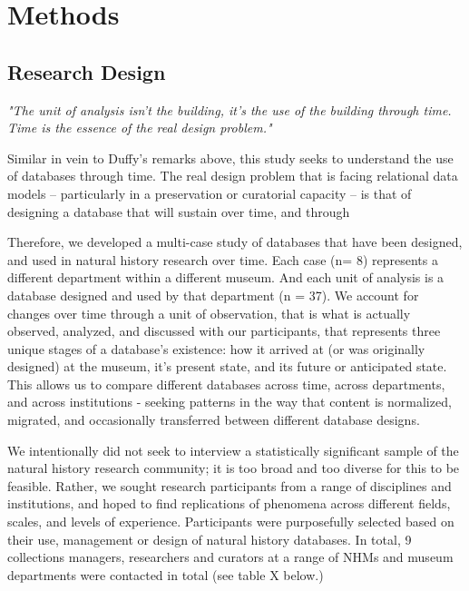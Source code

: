 \section{Methods}

\subsection{Research Design}
\textit{"The unit of analysis isn't the building, it's the use of the building through time. Time is the essence of the real design problem."}\cite{duffy1990measuring}

Similar in vein to Duffy's remarks above, this study seeks to understand the use of databases through time. The real design problem that is facing relational data models -- particularly in a preservation or curatorial capacity -- is that of designing a database that will sustain over time, and through  

Therefore, we developed a multi-case study of databases that have been designed, and used in natural history research over time. Each case (n= 8) represents a different department within a different museum. And each unit of analysis is a database designed and used by that department (n = 37). We account for changes over time through a unit of observation, that is what is actually observed, analyzed, and discussed with our participants, that represents three unique stages of a database's existence: how it arrived at (or was originally designed) at the museum, it's present state, and its future or anticipated state. This allows us to compare different databases across time, across departments, and across institutions - seeking patterns in the way that content is normalized, migrated, and occasionally transferred between different database designs. 

We intentionally did not seek to interview a statistically significant sample of the natural history research community; it is too broad and too diverse for this to be feasible.  Rather, we sought research participants from a range of disciplines and institutions, and hoped to find replications of phenomena across different fields, scales, and levels of experience. Participants were purposefully selected based on their use, management or design of natural history databases. In total, 9 collections managers, researchers and curators at a range of NHMs and museum departments were contacted in total (see table X below.) 


